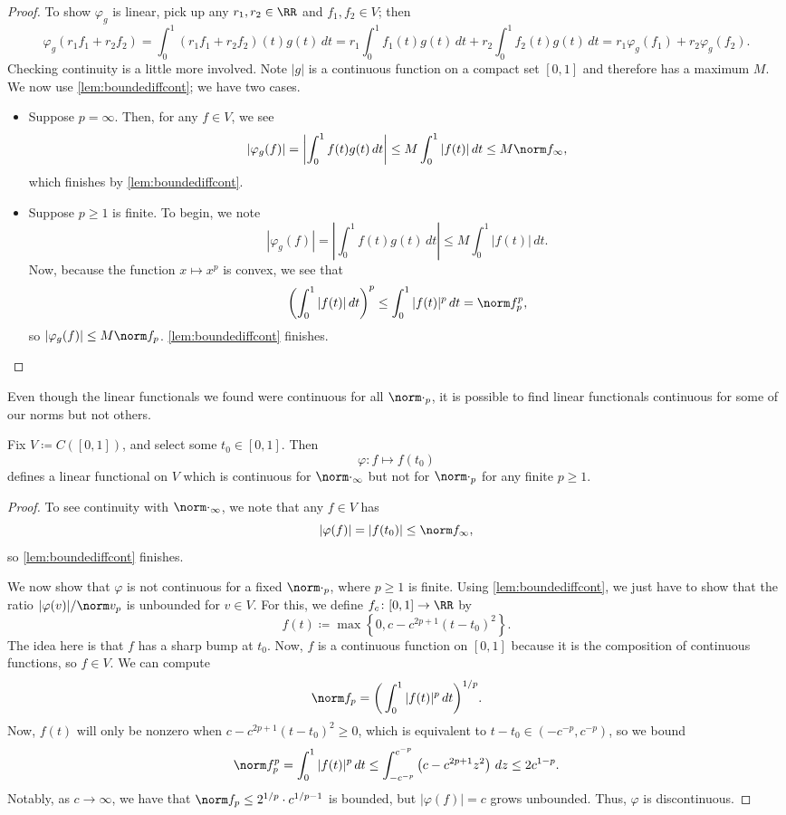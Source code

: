 \documentclass[../notes.tex]{subfiles}
\begin{document}
\begin{proof}
	To show $\varphi_g$ is linear, pick up any $r_1,r_2\in\RR$ and $f_1,f_2\in V$; then
	\[\varphi_g(r_1f_1+r_2f_2)=\int_0^1(r_1f_1+r_2f_2)(t)g(t)\,dt=r_1\int_0^1f_1(t)g(t)\,dt+r_2\int_0^1f_2(t)g(t)\,dt=r_1\varphi_g(f_1)+r_2\varphi_g(f_2).\]
	Checking continuity is a little more involved. Note $|g|$ is a continuous function on a compact set $[0,1]$ and therefore has a maximum $M$. We now use \autoref{lem:boundediffcont}; we have two cases.
	\begin{itemize}
		\item Suppose $p=\infty$. Then, for any $f\in V$, we see
		\[|\varphi_g(f)|=\left|\int_0^1f(t)g(t)\,dt\right|\le M\int_0^1|f(t)|\,dt\le M\norm f_\infty,\]
		which finishes by \autoref{lem:boundediffcont}.
		\item Suppose $p\ge1$ is finite. To begin, we note
		\[|\varphi_g(f)|=\left|\int_0^1f(t)g(t)\,dt\right|\le M\int_0^1|f(t)|\,dt.\]
		Now, because the function $x\mapsto x^p$ is convex, we see that
		\[\left(\int_0^1|f(t)|\,dt\right)^p\le\int_0^1|f(t)|^p\,dt=\norm f_p^p,\]
		so $|\varphi_g(f)|\le M\norm f_p$. \autoref{lem:boundediffcont} finishes.
		\qedhere
	\end{itemize}
\end{proof}
Even though the linear functionals we found were continuous for all $\norm\cdot_p$, it is possible to find linear functionals continuous for some of our norms but not others.
\begin{exe}
	Fix $V\coloneqq C([0,1])$, and select some $t_0\in[0,1]$. Then
	\[\varphi\colon f\mapsto f(t_0)\]
	defines a linear functional on $V$ which is continuous for $\norm\cdot_\infty$ but not for $\norm\cdot_p$ for any finite $p\ge1$.
\end{exe}
\begin{proof}
	To see continuity with $\norm\cdot_\infty$, we note that any $f\in V$ has
	\[|\varphi(f)|=|f(t_0)|\le\norm f_\infty,\]
	so \autoref{lem:boundediffcont} finishes.

	We now show that $\varphi$ is not continuous for a fixed $\norm\cdot_p$, where $p\ge1$ is finite. Using \autoref{lem:boundediffcont}, we just have to show that the ratio $|\varphi(v)|/\norm v_p$ is unbounded for $v\in V$. For this, we define $f_c\colon[0,1]\to\RR$ by
	\[f(t)\coloneqq\max\left\{0,c-c^{2p+1}(t-t_0)^2\right\}.\]
	The idea here is that $f$ has a sharp bump at $t_0$. Now, $f$ is a continuous function on $[0,1]$ because it is the composition of continuous functions, so $f\in V$. We can compute
	\[\norm f_p=\bigg(\int_0^1|f(t)|^p\,dt\bigg)^{1/p}.\]
	Now, $f(t)$ will only be nonzero when $c-c^{2p+1}(t-t_0)^2\ge0$, which is equivalent to $t-t_0\in\left(-c^{-p},c^{-p}\right)$, so we bound
	\[\norm f_p^p=\int_0^1|f(t)|^p\,dt\le\int_{-c^{-p}}^{c^{-p}}\left(c-c^{2p+1}z^2\right)\,dz\le2c^{1-p}.\]
	Notably, as $c\to\infty$, we have that $\norm f_p\le2^{1/p}\cdot c^{1/p-1}$ is bounded, but $|\varphi(f)|=c$ grows unbounded. Thus, $\varphi$ is discontinuous.
\end{proof}
\end{document}
